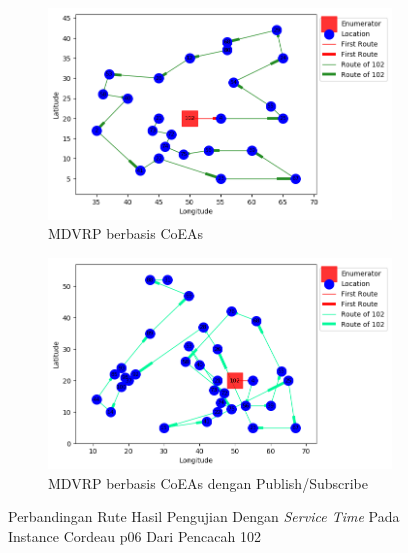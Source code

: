 \begin{figure}[H]
	\centering
	\begin{subfigure}[t]{\textwidth}
		\centering
		\includegraphics[width=\textwidth]{Resources/Images/cordeau_p06_tw/cordeau_p06_tw_102_coes}
		\caption{MDVRP berbasis CoEAs}
		\label{fig:cordeau_p06_tw_102_coes}
	\end{subfigure}
	\begin{subfigure}[t]{\textwidth}
		\centering
		\includegraphics[width=\textwidth]{Resources/Images/cordeau_p06_tw/cordeau_p06_tw_102_pubsub_coes}
		\caption{MDVRP berbasis CoEAs dengan Publish/Subscribe}
		\label{fig:cordeau_p06_tw_102_pubsub_coes}
	\end{subfigure}
	\caption{Perbandingan Rute Hasil Pengujian Dengan \textit{Service Time} Pada Instance Cordeau p06 Dari Pencacah 102}
	\label{fig:cordeau_p06_tw_102}
\end{figure}


